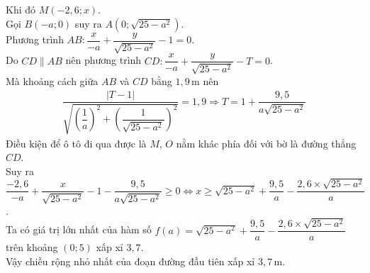 \begin{bt}
{\begin{center}
\begin{tikzpicture}[line join=round, line cap=round,scale=.7,transform shape,>=stealth]
		\end{tikzpicture}
	\end{center}
	Khi đó $M(-2{,}6;x)$.\\
	Gọi $B(-a;0)$ suy ra $A\left(0 ; \sqrt{25-a^2}\right)$.\\
	Phương trình $A B\colon \dfrac{x}{-a}+\dfrac{y}{\sqrt{25-a^2}}-1=0$.\\
	Do $CD \parallel AB$ nên phương trình $CD\colon \dfrac{x}{-a}+\dfrac{y}{\sqrt{25-a^2}}-T=0$.\\
	Mà khoảng cách giữa $A B$ và $C D$ bằng $1{,}9$\,m nên
	\begin{align*}
		\dfrac{|T-1|}{\sqrt{\left(\dfrac{1}{a}\right)^2+\left(\dfrac{1}{\sqrt{25-a^2}}\right)^2}}=1{,}9 \Rightarrow T=1+\dfrac{9{,}5}{a \sqrt{25-a^2}}
	\end{align*}
	Điều kiện để ô tô đi qua được là $M$, $O$ nằm khác phía đối với bờ là đường thẳng $CD$.\\
	Suy ra $\dfrac{-2{,}6}{-a}+\dfrac{x}{\sqrt{25-a^2}}-1-\dfrac{9{,}5}{a \sqrt{25-a^2}} \geq 0 \Leftrightarrow x \geq \sqrt{25-a^2}+\dfrac{9{,}5}{a}-\dfrac{2{,}6 \times \sqrt{25-a^2}}{a}$.\\
	Ta có giá trị lớn nhất của hàm số $f(a)=\sqrt{25-a^2}+\dfrac{9{,}5}{a}-\dfrac{2{,}6 \times \sqrt{25-a^2}}{a}$ trên khoảng $(0;5)$ xấp xỉ $3{,}7$.\\
	Vậy chiều rộng nhỏ nhất của đoạn đường đầu tiên xấp xỉ $3{,}7$\,m.
	}
\end{bt}


